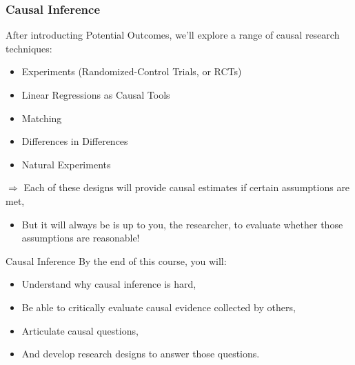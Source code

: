 \documentclass[11pt]{beamer}
\begin{document}
\begin{frame}[c]\frametitle{Causal Inference}
After introducting Potential Outcomes, we'll explore a range of causal research techniques:
\begin{itemize}
  \pause \item Experiments (Randomized-Control Trials, or RCTs)
  \pause \item Linear Regressions as Causal Tools 
  \pause \item Matching 
  \pause \item Differences in Differences
  \pause \item Natural Experiments
\end{itemize}
\pause $\Rightarrow$ Each of these designs will provide causal estimates \alert{if certain assumptions are met}, 
\begin{itemize}
  \pause \item But it will always be is up to you, the researcher, to evaluate whether those assumptions are reasonable!
\end{itemize}
\end{frame}

\begin{frame}[c]{Causal Inference}
  By the end of this course, you will:
  \begin{itemize}
      \item Understand why causal inference is hard, \\
      \pause \item Be able to critically evaluate causal evidence collected by others, \\
      \pause \item Articulate causal questions, \\
      \pause \item And develop research designs to answer those questions. 
  \end{itemize}
  \end{frame}
  
\end{document}
